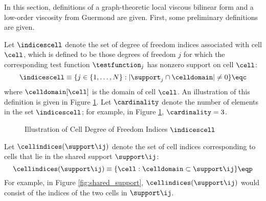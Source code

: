 In this section, definitions of a graph-theoretic local viscous bilinear form
and a low-order viscosity from Guermond \cite{guermond_firstorder} are given.
First, some preliminary definitions are given.

Let $\indicescell$ denote the set of degree of freedom indices associated with
cell $\cell$, which is defined to be those degrees of freedom $j$ for which the
corresponding test function $\testfunction_j$ has nonzero support on cell
$\cell$:
\begin{equation}
  \indicescell \equiv \{j\in\{1,\ldots,N\}: |\support_j\cap \celldomain|\ne 0\}
  \eqc
\end{equation}
where $\celldomain[\cell]$ is the domain of cell $\cell$. An illustration of
this definition is given in Figure \ref{fig:cell_indices}.
Let $\cardinality$ denote the number of elements in the set $\indicescell$;
for example, in Figure \ref{fig:cell_indices}, $\cardinality=3$.
\begin{figure}[ht]
   \centering
     
      \caption{Illustration of Cell Degree of Freedom Indices $\indicescell$}
   \label{fig:cell_indices}
\end{figure}
Let $\cellindices(\support\ij)$ denote the set of cell indices corresponding
to cells that lie in the shared support $\support\ij$:
\begin{equation}
  \cellindices(\support\ij) \equiv \{\cell: \celldomain \subset \support\ij\}
  \eqp
\end{equation}
For example, in Figure \ref{fig:shared_support}, $\cellindices(\support\ij)$
would consist of the indices of the two cells in $\support\ij$.

